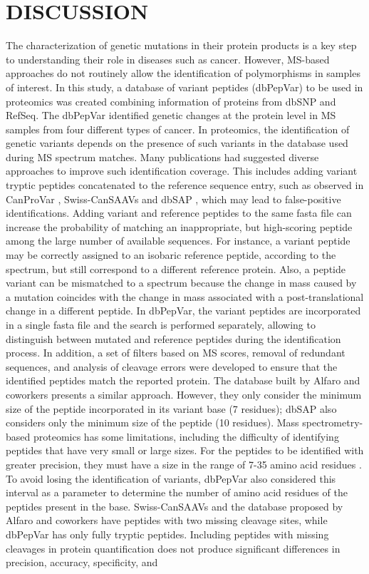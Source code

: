 \documentclass{ieeeaccess}
\begin{document}
\section{DISCUSSION}
    
The characterization of genetic mutations in their protein products is a key step to understanding their role in diseases such as cancer. However, MS-based approaches do not routinely allow the identification of polymorphisms in samples of interest. In this study, a database of variant peptides (dbPepVar) to be used in proteomics was created combining information of proteins from dbSNP and RefSeq. The dbPepVar identified genetic changes at the protein level in MS samples from four different types of cancer. In proteomics, the identification of genetic variants depends on the presence of such variants in the database used during MS spectrum matches. Many publications had suggested diverse approaches to improve such identification coverage. This includes adding variant tryptic peptides concatenated to the reference sequence entry, such as observed in CanProVar \cite{Li2010-px,Zhang2017-yz}, Swiss-CanSAAVs \cite{Song2014-bn} and dbSAP \cite{Song2014-bn,Cao2017-pv}, which may lead to false-positive identifications. Adding variant and reference peptides to the same fasta file can increase the probability of matching an inappropriate, but high-scoring peptide among the large number of available sequences. For instance, a variant peptide may be correctly assigned to an isobaric reference peptide, according to the spectrum, but still correspond to a different reference protein. Also, a peptide variant can be mismatched to a spectrum because the change in mass caused by a mutation coincides with the change in mass associated with a post-translational change in a different peptide. In dbPepVar, the variant peptides are incorporated in a single fasta file and the search is performed separately, allowing to distinguish between mutated and reference peptides during the identification process. In addition, a set of filters based on MS scores, removal of redundant sequences, and analysis of cleavage errors were developed to ensure that the identified peptides match the reported protein. The database built by Alfaro and coworkers \cite{Alfaro2017-vp} presents a similar approach. However, they only consider the minimum size of the peptide incorporated in its variant base (7 residues); dbSAP also considers only the minimum size of the peptide (10 residues). Mass spectrometry-based proteomics has some limitations, including the difficulty of identifying peptides that have very small or large sizes. For the peptides to be identified with greater precision, they must have a size in the range of 7-35 amino acid residues \cite{Swaney2010-px}. To avoid losing the identification of variants, dbPepVar also considered this interval as a parameter to determine the number of amino acid residues of the peptides present in the base. Swiss-CanSAAVs and the database proposed by Alfaro and coworkers have peptides with two missing cleavage sites, while dbPepVar has only fully tryptic peptides. Including peptides with missing cleavages in protein quantification does not produce significant differences in precision, accuracy, specificity, and 
\end{document}
